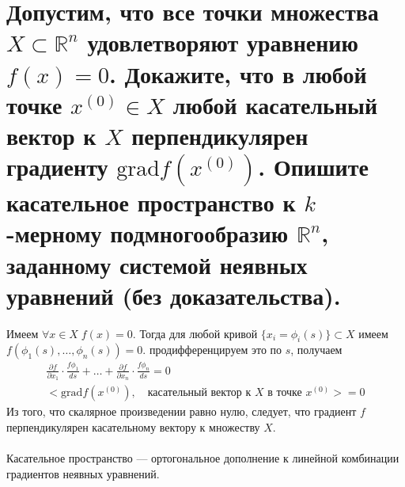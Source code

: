 \documentclass{article}
\begin{document}
\section{Допустим, что все точки множества $X \subset \mathbb{R}^n$ удовлетворяют уравнению $f(x)=0$. Докажите, что в любой точке $x^{(0)}\in X$ любой касательный вектор к $X$ перпендикулярен градиенту $\mathrm{grad}f(x^{(0)})$. Опишите касательное пространство к $k$-мерному подмногообразию $\mathbb{R}^n$, заданному системой неявных уравнений (без доказательства).}
Имеем $\forall x \in X \; f(x) = 0$. Тогда для любой кривой $\{x_i=\phi_i(s)\} \subset X$ имеем $f(\phi_1(s),\dotsc,\phi_n(s))=0$. продифференцируем это по $s$, получаем
\begin{gather*}
    \frac{\partial f}{\partial x_1} \cdot \frac{f\phi_1}{ds}+\dotsc + \frac{\partial f}{\partial x_n} \cdot \frac{f\phi_n}{ds} = 0\\
    <\mathrm{grad}f(x^{(0)}),\quad \text{касательный вектор к $X$ в точке $x^{(0)}$}>=0
\end{gather*}
Из того, что скалярное произведении равно нулю, следует, что градиент $f$ перпендикулярен касательному вектору к множеству $X$.\\\\
Касательное пространство --- ортогональное дополнение к линейной комбинации градиентов неявных уравнений.
\end{document}

